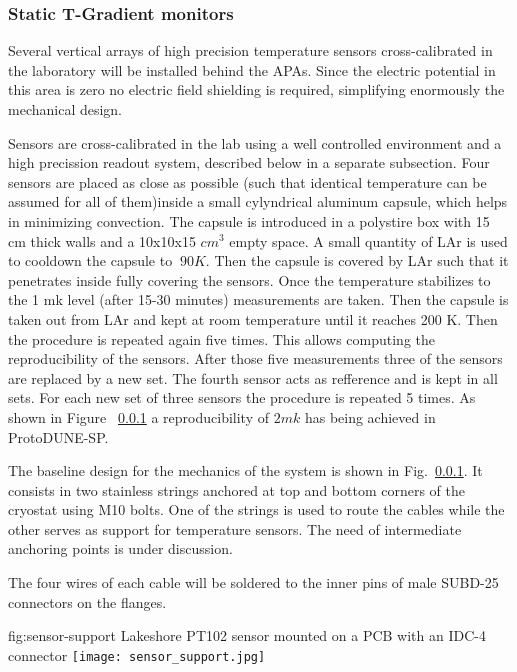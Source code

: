 \subsubsection{Static T-Gradient monitors}

Several vertical arrays of high precision temperature sensors cross-calibrated in the laboratory will be installed behind the APAs.
Since the electric potential in this area is zero no electric field shielding is required, simplifying enormously the mechanical design.

Sensors are cross-calibrated in the lab using a well controlled environment and a high precission readout system, described below in a separate subsection.  
Four sensors are placed as close as possible (such that identical temperature can be assumed for all of them)inside a small cylyndrical aluminum capsule,
which helps in minimizing convection. The capsule is introduced in a polystire box with 15 cm thick walls
and a 10x10x15 $cm^3$ empty space. A small quantity of LAr is used to cooldown the capsule to $~90 K$. Then the capsule is covered by LAr such that it penetrates
inside fully covering the sensors. Once the temperature stabilizes to the 1 mk level (after 15-30 minutes) measurements are taken. Then the capsule is taken out from LAr
and kept at room temperature until it reaches 200 K. Then the procedure is repeated again five times. This allows computing the reproducibility of the sensors.
After those five measurements three of the sensors are replaced by a new set. The fourth sensor acts as refference and is kept in all sets. For each new set of three
sensors the procedure is repeated 5 times. As shown in Figure ~\ref{} a reproducibility of $2 mk$ has being achieved in ProtoDUNE-SP. 

The baseline design for the mechanics of the system is shown in Fig.~\ref{}. It consists in two stainless strings anchored at top and bottom corners of the cryostat
using M10 bolts. One of the strings is used to route the cables while the other serves as support for temperature sensors. The need of intermediate anchoring points is under discussion. 


The four wires of each cable will be soldered to the inner pins of male SUBD-25 connectors on the flanges. 

\begin{dunefigure}{fig:sensor-support}
  {Lakeshore PT102 sensor mounted on a PCB with an IDC-4 connector}
  \texttt{[image: sensor\_support.jpg]}%
\end{dunefigure}

